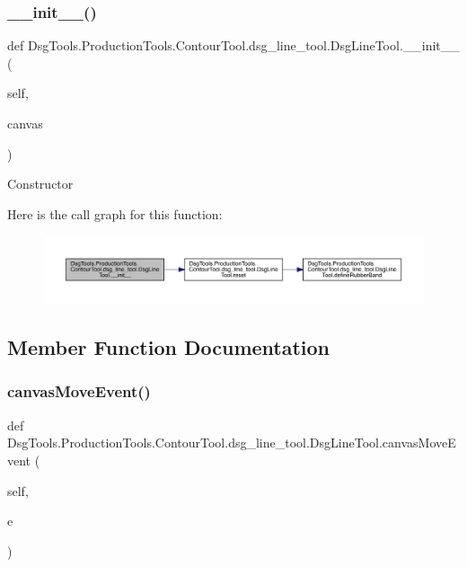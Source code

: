 \subsubsection{\texorpdfstring{\+\_\+\+\_\+init\+\_\+\+\_\+()}{\_\_init\_\_()}}
{\footnotesize\ttfamily def Dsg\+Tools.\+Production\+Tools.\+Contour\+Tool.\+dsg\+\_\+line\+\_\+tool.\+Dsg\+Line\+Tool.\+\_\+\+\_\+init\+\_\+\+\_\+ (\begin{DoxyParamCaption}\item[{}]{self,  }\item[{}]{canvas }\end{DoxyParamCaption})}

\begin{DoxyVerb}Constructor
\end{DoxyVerb}
 Here is the call graph for this function\+:
\nopagebreak
\begin{figure}[H]
\begin{center}
\leavevmode
\includegraphics[width=350pt]{class_dsg_tools_1_1_production_tools_1_1_contour_tool_1_1dsg__line__tool_1_1_dsg_line_tool_a8bff8d746bf95fb9dbe21ef083ce5cfd_cgraph}
\end{center}
\end{figure}


\subsection{Member Function Documentation}
\mbox{\label{class_dsg_tools_1_1_production_tools_1_1_contour_tool_1_1dsg__line__tool_1_1_dsg_line_tool_ab00cc182b6fd3fda100a0fda14b5cf22}} 
\subsubsection{\texorpdfstring{canvas\+Move\+Event()}{canvasMoveEvent()}}
{\footnotesize\ttfamily def Dsg\+Tools.\+Production\+Tools.\+Contour\+Tool.\+dsg\+\_\+line\+\_\+tool.\+Dsg\+Line\+Tool.\+canvas\+Move\+Event (\begin{DoxyParamCaption}\item[{}]{self,  }\item[{}]{e }\end{DoxyParamCaption})}

